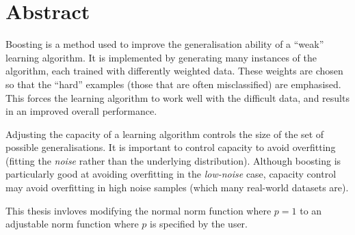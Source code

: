 \chapter{Abstract}

Boosting is a method used to improve the generalisation ability of a
``weak'' learning algorithm.  It is implemented by generating many
instances of the algorithm, each trained with differently weighted
data.  These weights are chosen so that the ``hard'' examples (those
that are often misclassified) are emphasised.  This forces the
learning algorithm to work well with the difficult data, and results
in an improved overall performance.

Adjusting the capacity of a learning algorithm controls the size of
the set of possible generalisations.  It is important to control
capacity to avoid overfitting (fitting the \emph{noise} rather than
the underlying distribution).  Although boosting is particularly good
at avoiding overfitting in the \emph{low-noise} case, capacity control
may avoid overfitting in high noise samples (which many real-world
datasets are).

This thesis invloves modifying the normal norm function where $p=1$ to
an adjustable norm function where $p$ is specified by the user.
